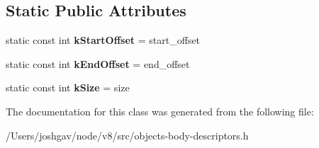 \subsection*{Static Public Attributes}
\begin{DoxyCompactItemize}
\item 
static const int {\bfseries k\+Start\+Offset} = start\+\_\+offset\hypertarget{classv8_1_1internal_1_1_fixed_body_descriptor_a1c2c5b9bd26b6d92dc7c86f4c54db927}{}\label{classv8_1_1internal_1_1_fixed_body_descriptor_a1c2c5b9bd26b6d92dc7c86f4c54db927}

\item 
static const int {\bfseries k\+End\+Offset} = end\+\_\+offset\hypertarget{classv8_1_1internal_1_1_fixed_body_descriptor_a5cfa9c5d4e9f97129ac63145e583a7ae}{}\label{classv8_1_1internal_1_1_fixed_body_descriptor_a5cfa9c5d4e9f97129ac63145e583a7ae}

\item 
static const int {\bfseries k\+Size} = size\hypertarget{classv8_1_1internal_1_1_fixed_body_descriptor_a03c0893d55c2985366e4d64060bae196}{}\label{classv8_1_1internal_1_1_fixed_body_descriptor_a03c0893d55c2985366e4d64060bae196}

\end{DoxyCompactItemize}


The documentation for this class was generated from the following file\+:\begin{DoxyCompactItemize}
\item 
/\+Users/joshgav/node/v8/src/objects-\/body-\/descriptors.\+h\end{DoxyCompactItemize}
